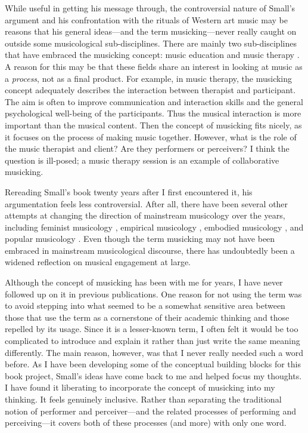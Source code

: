 While useful in getting his message through, the controversial nature of Small's argument and his confrontation with the rituals of Western art music may be reasons that his general ideas---and the term musicking---never really caught on outside some musicological sub-disciplines. There are mainly two sub-disciplines that have embraced the musicking concept: music education and music therapy \citep{ansdell_how_2014}. A reason for this may be that these fields share an interest in looking at music as a \emph{process}, not as a final product. For example, in music therapy, the musicking concept adequately describes the interaction between therapist and participant. The aim is often to improve communication and interaction skills and the general psychological well-being of the participants. Thus the musical interaction is more important than the musical content. Then the concept of musicking fits nicely, as it focuses on the process of making music together. However, what is the role of the music therapist and client? Are they performers or perceivers? I think the question is ill-posed; a music therapy session is an example of collaborative musicking.

Rereading Small's book twenty years after I first encountered it, his argumentation feels less controversial. After all, there have been several other attempts at changing the direction of mainstream musicology over the years, including feminist musicology \citep{mcclary_feminine_1991}, empirical musicology \citep{clarke_empirical_2004}, embodied musicology \citep{leman_embodied_2008}, and popular musicology \citep{scott_ashgate_2009}. Even though the term musicking may not have been embraced in mainstream musicological discourse, there has undoubtedly been a widened reflection on musical engagement at large.



Although the concept of musicking has been with me for years, I have never followed up on it in previous publications. One reason for not using the term was to avoid stepping into what seemed to be a somewhat sensitive area between those that use the term as a cornerstone of their academic thinking and those repelled by its usage. Since it is a lesser-known term, I often felt it would be too complicated to introduce and explain it rather than just write the same meaning differently. The main reason, however, was that I never really needed such a word before. As I have been developing some of the conceptual building blocks for this book project, Small's ideas have come back to me and helped focus my thoughts. I have found it liberating to incorporate the concept of musicking into my thinking. It feels genuinely inclusive. Rather than separating the traditional notion of performer and perceiver---and the related processes of performing and perceiving---it covers both of these processes (and more) with only one word.

